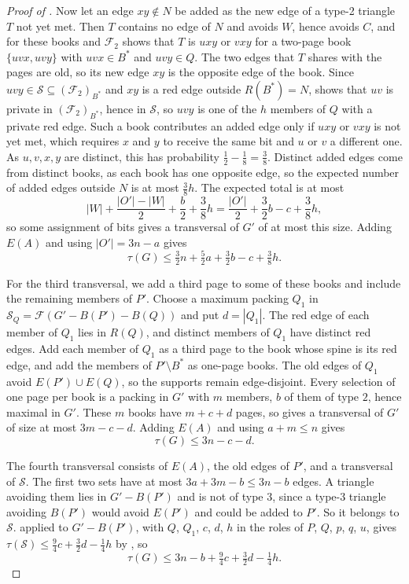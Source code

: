 \documentclass[11pt]{article}
\theoremstyle{remark}
\newcommand{\F}{\mathcal F}
\newcommand{\Sfam}{\mathcal S}
\begin{document}
\begin{proof}[Proof of ]
Now let an edge $xy\notin N$ be added as the new edge of a type-2 triangle $T$ not yet met. Then $T$ contains no edge of $N$ and avoids $W$, hence avoids $C$, and  for these books and $\F_2$ shows that $T$ is $uxy$ or $vxy$ for a two-page book $\{uvx,uvy\}$ with $uvx\in B^*$ and $uvy\in Q$. The two edges that $T$ shares with the pages are old, so its new edge $xy$ is the opposite edge of the book. Since $uvy\in\Sfam\subseteq(\F_2)_{B^*}$ and $xy$ is a red edge outside $R(B^*)=N$,  shows that $uv$ is private in $(\F_2)_{B^*}$, hence in $\Sfam$, so $uvy$ is one of the $h$ members of $Q$ with a private red edge. Such a book contributes an added edge only if $uxy$ or $vxy$ is not yet met, which requires $x$ and $y$ to receive the same bit and $u$ or $v$ a different one. As $u,v,x,y$ are distinct, this has probability $\frac12-\frac18=\frac38$. Distinct added edges come from distinct books, as each book has one opposite edge, so the expected number of added edges outside $N$ is at most $\frac38h$. The expected total is at most
\[
 |W|+\frac{|O'|-|W|}{2}+\frac b2+\frac38h
 =\frac{|O'|}{2}+\frac32b-c+\frac38h,
\]
so some assignment of bits gives a transversal of $G'$ of at most this size. Adding $E(A)$ and using $|O'|=3n-a$ gives
\begin{equation}
 \tau(G)\le\tfrac32n+\tfrac52a+\tfrac32b-c+\tfrac38h.\label{eq:I2}
\end{equation}

For the third transversal, we add a third page to some of these books and include the remaining members of $P'$. Choose a maximum packing $Q_1$ in $\Sfam_Q=\F(G'-B(P')-B(Q))$ and put $d=|Q_1|$. The red edge of each member of $Q_1$ lies in $R(Q)$, and distinct members of $Q_1$ have distinct red edges. Add each member of $Q_1$ as a third page to the book whose spine is its red edge, and add the members of $P'\setminus B^*$ as one-page books. The old edges of $Q_1$ avoid $E(P')\cup E(Q)$, so the supports remain edge-disjoint. Every selection of one page per book is a packing in $G'$ with $m$ members, $b$ of them of type $2$, hence maximal in $G'$. These $m$ books have $m+c+d$ pages, so  gives a transversal of $G'$ of size at most $3m-c-d$. Adding $E(A)$ and using $a+m\le n$ gives
\begin{equation}
 \tau(G)\le3n-c-d.\label{eq:I3}
\end{equation}

The fourth transversal consists of $E(A)$, the old edges of $P'$, and a transversal of $\Sfam$. The first two sets have at most $3a+3m-b\le3n-b$ edges. A triangle avoiding them lies in $G'-B(P')$ and is not of type $3$, since a type-3 triangle avoiding $B(P')$ would avoid $E(P')$ and could be added to $P'$. So it belongs to $\Sfam$.  applied to $G'-B(P')$, with $Q$, $Q_1$, $c$, $d$, $h$ in the roles of $P$, $Q$, $p$, $q$, $u$, gives $\tau(\Sfam)\le\frac94c+\frac32d-\frac14h$ by , so
\begin{equation}
 \tau(G)\le3n-b+\tfrac94c+\tfrac32d-\tfrac14h.\label{eq:I4}
\end{equation}


\end{proof}
\end{document}
